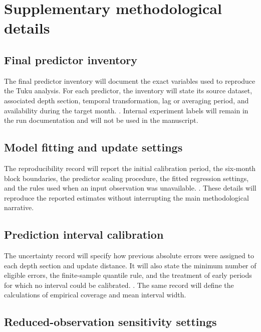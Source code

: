 \section{Supplementary methodological details}
\label{app:methods}

\subsection{Final predictor inventory}
\label{app:predictors}

The final predictor inventory will document the exact variables used to reproduce the Tuku analysis. For each predictor, the inventory will state its source dataset, associated depth section, temporal transformation, lag or averaging period, and availability during the target month. . Internal experiment labels will remain in the run documentation and will not be used in the manuscript.

\subsection{Model fitting and update settings}
\label{app:model_settings}

The reproducibility record will report the initial calibration period, the six-month block boundaries, the predictor scaling procedure, the fitted regression settings, and the rules used when an input observation was unavailable. . These details will reproduce the reported estimates without interrupting the main methodological narrative.

\subsection{Prediction interval calibration}
\label{app:intervals}

The uncertainty record will specify how previous absolute errors were assigned to each depth section and update distance. It will also state the minimum number of eligible errors, the finite-sample quantile rule, and the treatment of early periods for which no interval could be calibrated. . The same record will define the calculations of empirical coverage and mean interval width.

\subsection{Reduced-observation sensitivity settings}
\label{app:no_update_settings}

